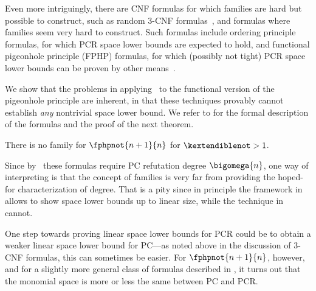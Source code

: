 Even more intriguingly, there are CNF formulas for which
\kextendibleNok families are hard but possible to construct, such as
random $3$-CNF formulas~\cite{BBGHMW17SpaceProofCplx}, and formulas
where \kextendibleNok families seem very hard to construct. Such
formulas include ordering principle formulas, for which PCR space
lower bounds are expected to hold, and functional pigeonhole principle
(FPHP) formulas, for which (possibly not tight) PCR space lower bounds
can be proven by other means~\cite{GKT19SpaceWidth}.

We show that the problems in applying~%
\cite{BG15Framework}
to the functional version of the pigeonhole principle are inherent, 
in that these techniques provably cannot establish
%
\emph{any} nontrivial
space lower bound.
%
We refer to
%
  for the formal description of the formulas
  and
%
%
%
  the proof of the 
  next theorem.

\begin{theorem}
  \label{th:no-kextendible}
  There is no \kextendible family for
  $\fphpnot{n+1}{n}$ 
%
  for
  $\kextendiblenot>1$. 
\end{theorem}
  
%
%
%
%
%
%
%
%
%
%
%
%
%
%
%
%
%
%
%
%
%
%
%
%
%
%
%
%
%
%
%

Since by~\cite{Razborov98LowerBound,MN15GeneralizedMethodDegree}
these formulas
require PC refutation
degree $\bigomega{n}$, one way of interpreting
 is that the concept of \kextendible families
is very far from providing the hoped-for characterization of degree.
%
That is a pity since in principle the framework
in~\cite{BG15Framework} allows to show space lower bounds up to linear
size, while the technique in~\cite{GKT19SpaceWidth} cannot.

One step towards proving linear space lower bounds for PCR could be to
obtain a weaker linear space lower bound for PC---as noted above in
the discussion of \mbox{$3$-CNF} formulas, this can sometimes
be easier.
%
For
$\fphpnot{n+1}{n}$,
%
however,
and for a slightly more general class of formulas
described in
 ,
%
%
%
%
it turns out that the monomial space is more or less the same
between PC and PCR.

%



